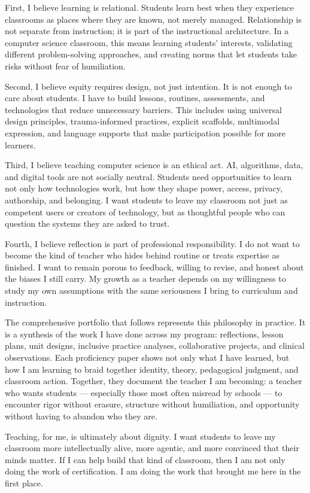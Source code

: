 \documentclass[12pt]{article}
\begin{document}
First, I believe learning is relational. Students learn best when they experience classrooms as places where they are known, not merely managed. Relationship is not separate from instruction; it is part of the instructional architecture. In a computer science classroom, this means learning students' interests, validating different problem-solving approaches, and creating norms that let students take risks without fear of humiliation.

Second, I believe equity requires design, not just intention. It is not enough to care about students. I have to build lessons, routines, assessments, and technologies that reduce unnecessary barriers. This includes using universal design principles, trauma-informed practices, explicit scaffolds, multimodal expression, and language supports that make participation possible for more learners.

Third, I believe teaching computer science is an ethical act. AI, algorithms, data, and digital tools are not socially neutral. Students need opportunities to learn not only how technologies work, but how they shape power, access, privacy, authorship, and belonging. I want students to leave my classroom not just as competent users or creators of technology, but as thoughtful people who can question the systems they are asked to trust.

Fourth, I believe reflection is part of professional responsibility. I do not want to become the kind of teacher who hides behind routine or treats expertise as finished. I want to remain porous to feedback, willing to revise, and honest about the biases I still carry. My growth as a teacher depends on my willingness to study my own assumptions with the same seriousness I bring to curriculum and instruction.

The comprehensive portfolio that follows represents this philosophy in practice. It is a synthesis of the work I have done across my program: reflections, lesson plans, unit designs, inclusive practice analyses, collaborative projects, and clinical observations. Each proficiency paper shows not only what I have learned, but how I am learning to braid together identity, theory, pedagogical judgment, and classroom action. Together, they document the teacher I am becoming: a teacher who wants students --- especially those most often misread by schools --- to encounter rigor without erasure, structure without humiliation, and opportunity without having to abandon who they are.

Teaching, for me, is ultimately about dignity. I want students to leave my classroom more intellectually alive, more agentic, and more convinced that their minds matter. If I can help build that kind of classroom, then I am not only doing the work of certification. I am doing the work that brought me here in the first place.
\end{document}
